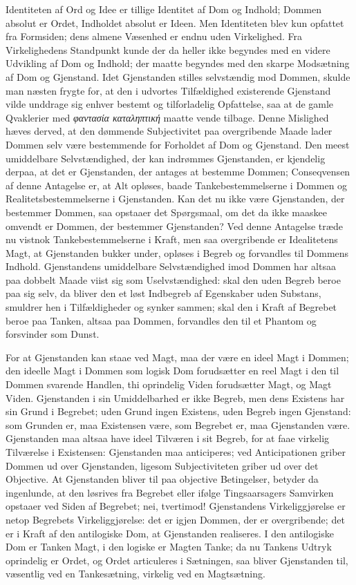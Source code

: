 \documentclass[12pt]{book}
\newcommand{\opage}[1]{\marginnote{\footnotesize\textit{[#1]}}}
\begin{document}
Identiteten af Ord og Idee er tillige Identitet af Dom
og Indhold; Dommen absolut er Ordet, Indholdet absolut
er Ideen. Men Identiteten blev kun opfattet fra Formsiden;
dens almene Væsenhed er endnu uden Virkelighed. Fra Virkelighedens
Standpunkt kunde der da heller ikke begyndes med
en videre Udvikling af Dom og Indhold; der maatte begyndes
med den skarpe Modsætning af Dom og Gjenstand. Idet
Gjenstanden stilles selvstændig mod Dommen, skulde man næsten
frygte for, at den i udvortes Tilfældighed existerende Gjenstand
vilde unddrage sig enhver bestemt og tilforladelig Opfattelse,
saa at de gamle Qvaklerier med \textit{φαντασία καταληπτική}
maatte vende tilbage. Denne Mislighed hæves derved, at den
dømmende Subjectivitet paa overgribende Maade lader Dommen
selv være bestemmende for Forholdet af Dom og Gjenstand.
Den meest umiddelbare Selvstændighed, der kan
ind\opage{287}rømmes Gjenstanden, er kjendelig derpaa, at det er Gjenstanden,
der antages at bestemme Dommen; Conseqvensen af
denne Antagelse er, at Alt opløses, baade Tankebestemmelserne
i Dommen og Realitetsbestemmelserne i Gjenstanden. Kan
det nu ikke være Gjenstanden, der bestemmer Dommen, saa
opstaaer det Spørgsmaal, om det da ikke maaskee omvendt er
Dommen, der bestemmer Gjenstanden? Ved denne Antagelse
træde nu vistnok Tankebestemmelserne i Kraft, men saa overgribende
er Idealitetens Magt, at Gjenstanden bukker under,
opløses i Begreb og forvandles til Dommens Indhold.
Gjenstandens umiddelbare Selvstændighed imod Dommen har
altsaa paa dobbelt Maade viist sig som Uselvstændighed: skal
den uden Begreb beroe paa sig selv, da bliver den et løst
Indbegreb af Egenskaber uden Substans, smuldrer hen i Tilfældigheder
og synker sammen; skal den i Kraft af Begrebet
beroe paa Tanken, altsaa paa Dommen, forvandles den til
et Phantom og forsvinder som Dunst.

For at Gjenstanden kan staae ved Magt, maa der være
en ideel Magt i Dommen; den ideelle Magt i Dommen som
logisk Dom forudsætter en reel Magt i den til Dommen
svarende Handlen, thi oprindelig Viden forudsætter Magt, og
Magt Viden. Gjenstanden i sin Umiddelbarhed er ikke Begreb,
men dens Existens har sin Grund i Begrebet; uden
Grund ingen Existens, uden Begreb ingen Gjenstand: som
Grunden er, maa Existensen være, som Begrebet er, maa
Gjenstanden være. Gjenstanden maa altsaa have ideel Tilværen
i sit Begreb, for at faae virkelig Tilværelse i Existensen:
Gjenstanden maa anticiperes; ved Anticipationen griber Dommen
ud over Gjenstanden, ligesom Subjectiviteten griber ud
over det Objective. At Gjenstanden bliver til paa objective
Betingelser, betyder da ingenlunde, at den løsrives fra Begrebet
eller ifølge Tingsaarsagers Samvirken opstaaer ved
Siden af Begrebet; nei, tvertimod! Gjenstandens Virkeliggjørelse
er netop Begrebets Virkeliggjørelse: det er
\opage{288}igjen Dommen, der er overgribende; det er i Kraft af den
antilogiske Dom, at Gjenstanden realiseres. I den antilogiske
Dom er Tanken Magt, i den logiske er Magten Tanke; da
nu Tankens Udtryk oprindelig er Ordet, og Ordet articuleres
i Sætningen, saa bliver Gjenstanden til, væsentlig ved en
Tankesætning, virkelig ved en Magtsætning.
\end{document}
